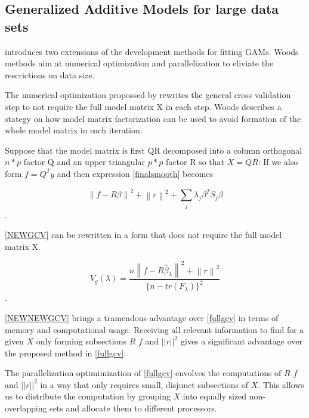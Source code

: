 \documentclass{article}
\begin{document}
    \subsection{Generalized Additive Models for large data sets}
    \cite{bigdataGAM} introduces two extensions of the development methods for fitting GAMs. Woods methods aim at numerical optimization and parallelization to eliviate the rescrictions on data size.

    The numerical optimization propossed by \cite{bigdataGAM} rewrites the general cross validation step to not require the full model matrix X in each step. Woods describes a stategy on how model matrix factorization can be used to avoid formation of the whole model matrix in each iteration.

    Suppose that the model matrix is first QR decomposed into a column orthogonal $n * p$ factor Q and an upper triangular $p * p$ factor R so that $X=QR$: If we also form $f =Q^Ty$ and then expression \ref{finalsmooth} becomes

    \begin{equation} \label{NEWGCV} \left \| f- R\beta \right \|^2 + \left \| r \right \|^2 + \sum_{j}^{ } \lambda_j \beta^T S_j \beta \end{equation}.

    \ref{NEWGCV} can be rewritten in a form that does not require the full model matrix X.

    \begin{equation} \label{NEWNEWGCV} V_g(\lambda) = \frac{n\left \| f-R\widehat{\beta}_\lambda \right \| ^2 + \left  \| r \right \| ^2}{\{n-tr(F_\lambda) \}^2} \end{equation}.

    \ref{NEWNEWGCV} brings a tramendous advantage over \ref{fullgcv} in terms of memory and computational usage. Receiving all relevant information to find \textlambda for a given $X$ only forming subsections $R$ $f$ and $||r||^2$ gives a significant advantage over the proposed method in \ref{fullgcv}.

    The parallelization optimimization of \ref{fullgcv} envolves the computations of $R$ $f$ and $||r||^2$ in a way that only requires small, disjunct subsections of $X$. This allows us to distribute the computation by grouping $X$ into equally sized non-overlapping sets and allocate them to different processors.
\end{document}
